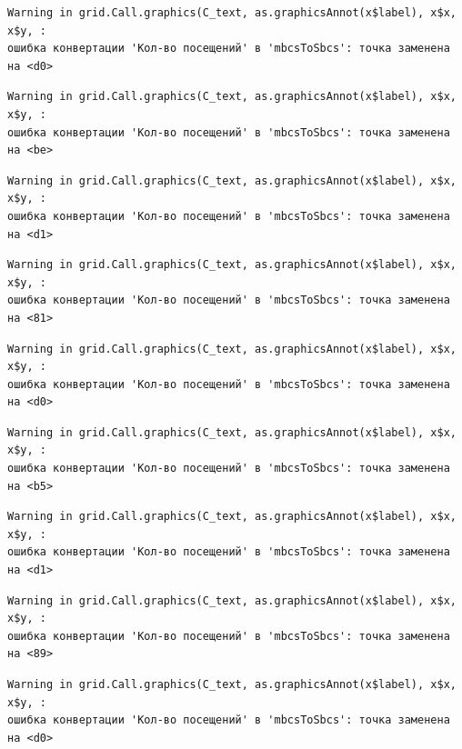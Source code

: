 \documentclass[
  letterpaper,
  DIV=11,
  numbers=noendperiod]{scrreprt}
\begin{document}
\begin{verbatim}
Warning in grid.Call.graphics(C_text, as.graphicsAnnot(x$label), x$x, x$y, :
ошибка конвертации 'Кол-во посещений' в 'mbcsToSbcs': точка заменена на <d0>
\end{verbatim}

\begin{verbatim}
Warning in grid.Call.graphics(C_text, as.graphicsAnnot(x$label), x$x, x$y, :
ошибка конвертации 'Кол-во посещений' в 'mbcsToSbcs': точка заменена на <be>
\end{verbatim}

\begin{verbatim}
Warning in grid.Call.graphics(C_text, as.graphicsAnnot(x$label), x$x, x$y, :
ошибка конвертации 'Кол-во посещений' в 'mbcsToSbcs': точка заменена на <d1>
\end{verbatim}

\begin{verbatim}
Warning in grid.Call.graphics(C_text, as.graphicsAnnot(x$label), x$x, x$y, :
ошибка конвертации 'Кол-во посещений' в 'mbcsToSbcs': точка заменена на <81>
\end{verbatim}

\begin{verbatim}
Warning in grid.Call.graphics(C_text, as.graphicsAnnot(x$label), x$x, x$y, :
ошибка конвертации 'Кол-во посещений' в 'mbcsToSbcs': точка заменена на <d0>
\end{verbatim}

\begin{verbatim}
Warning in grid.Call.graphics(C_text, as.graphicsAnnot(x$label), x$x, x$y, :
ошибка конвертации 'Кол-во посещений' в 'mbcsToSbcs': точка заменена на <b5>
\end{verbatim}

\begin{verbatim}
Warning in grid.Call.graphics(C_text, as.graphicsAnnot(x$label), x$x, x$y, :
ошибка конвертации 'Кол-во посещений' в 'mbcsToSbcs': точка заменена на <d1>
\end{verbatim}

\begin{verbatim}
Warning in grid.Call.graphics(C_text, as.graphicsAnnot(x$label), x$x, x$y, :
ошибка конвертации 'Кол-во посещений' в 'mbcsToSbcs': точка заменена на <89>
\end{verbatim}

\begin{verbatim}
Warning in grid.Call.graphics(C_text, as.graphicsAnnot(x$label), x$x, x$y, :
ошибка конвертации 'Кол-во посещений' в 'mbcsToSbcs': точка заменена на <d0>
\end{verbatim}
\end{document}
